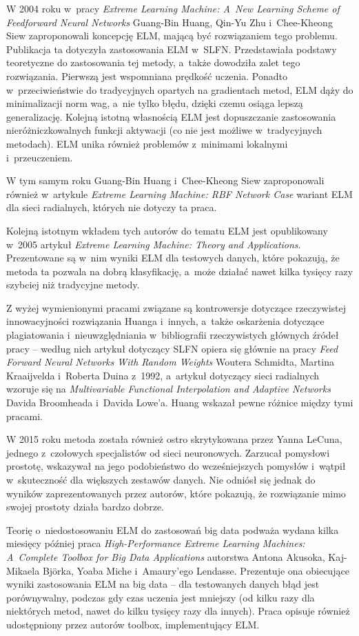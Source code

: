 \documentclass{article}
\begin{document}
W 2004 roku w~pracy \textit{Extreme Learning Machine: A~New Learning Scheme of Feedforward Neural Networks} Guang-Bin Huang, Qin-Yu Zhu i~Chee-Kheong Siew zaproponowali koncepcję ELM, mającą być rozwiązaniem tego problemu. Publikacja ta dotyczyła zastosowania ELM w~SLFN. Przedstawiała podstawy teoretyczne do zastosowania tej metody, a~także dowodziła zalet tego rozwiązania. Pierwszą jest wspomniana prędkość uczenia. Ponadto w~przeciwieństwie do tradycyjnych opartych na gradientach metod, ELM dąży do minimalizacji norm wag, a~nie tylko błędu, dzięki czemu osiąga lepszą generalizację. Kolejną istotną własnością ELM jest dopuszczanie zastosowania nieróżniczkowalnych funkcji aktywacji (co nie jest możliwe w~tradycyjnych metodach). ELM unika również problemów z~minimami lokalnymi i~przeuczeniem. 

W tym samym roku Guang-Bin Huang i~Chee-Kheong Siew zaproponowali również w~artykule \textit{Extreme Learning Machine: RBF Network Case} wariant ELM dla sieci radialnych, których nie dotyczy ta praca. 

Kolejną istotnym wkładem tych autorów do tematu ELM jest opublikowany w~2005 artykuł \textit{Extreme Learning Machine: Theory and Applications}. Prezentowane są w~nim wyniki ELM dla testowych danych, które pokazują, że metoda ta pozwala na dobrą klasyfikację, a~może działać nawet kilka tysięcy razy szybciej niż tradycyjne metody.

Z wyżej wymienionymi pracami związane są kontrowersje dotyczące rzeczywistej innowacyjności rozwiązania Huanga i~innych, a~także oskarżenia dotyczące plagiatowania i~nieuwzględniania w~bibliografii rzeczywistych głównych źródeł pracy -- według nich artykuł dotyczący SLFN opiera się głównie na pracy \textit{Feed Forward Neural Networks With Random Weights} Woutera Schmidta, Martina Kraaijvelda i~Roberta Duina z~1992, a~artykuł dotyczący sieci radialnych wzoruje się na \textit{Multivariable Functional Interpolation and Adaptive Networks} Davida Broomheada i~Davida Lowe'a. Huang wskazał pewne różnice między tymi pracami.

W 2015 roku metoda została również ostro skrytykowana przez Yanna LeCuna, jednego z~czołowych specjalistów od sieci neuronowych. Zarzucał pomysłowi prostotę, wskazywał na jego podobieństwo do wcześniejszych pomysłów i~wątpił w~skuteczność dla większych zestawów danych. Nie odniósł się jednak do wyników zaprezentowanych przez autorów, które pokazują, że rozwiązanie mimo swojej prostoty działa bardzo dobrze.

Teorię o~niedostosowaniu ELM do zastosowań big data podważa wydana kilka miesięcy później praca \textit{High-Performance Extreme Learning Machines: A~Complete Toolbox for Big Data Applications} autorstwa Antona Akusoka, Kaj-Mikaela Bj\"orka, Yoaba Miche i~Amaury'ego Lendasse. Prezentuje ona obiecujące wyniki zastosowania ELM na big data -- dla testowanych danych błąd jest porównywalny, podczas gdy czas uczenia jest mniejszy (od kilku razy dla niektórych metod, nawet do kilku tysięcy razy dla innych). Praca opisuje również udostępniony przez autorów toolbox, implementujący ELM.
\end{document}
